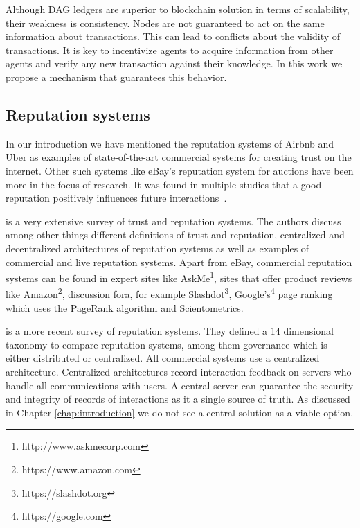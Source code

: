Although DAG ledgers are superior to blockchain solution in terms of scalability, their weakness is
consistency. Nodes are not guaranteed to act on the same information about transactions. This can 
lead to conflicts about the validity of transactions. It is key to incentivize agents to acquire 
information from other agents and verify any new transaction against their knowledge. In this work
we propose a mechanism that guarantees this behavior.

\subsection{Reputation systems}
In our introduction we have mentioned the reputation systems of Airbnb and Uber as examples of 
state-of-the-art commercial systems for creating trust on the internet. Other such systems like 
eBay's reputation system for auctions have been more in the focus of research. It was found in 
multiple studies that a good reputation positively influences future interactions~\cite{resnick2002trust, houser2006reputation, dewan2004adverse}.

\cite{josang2007survey} is a very extensive survey of trust and reputation systems. The authors 
discuss among other things different definitions of trust and reputation, centralized and decentralized architectures 
of reputation systems as well as examples of commercial and live reputation systems. Apart from 
eBay, commercial reputation systems can be found in expert sites like AskMe\footnote{http://www.askmecorp.com},
sites that offer product reviews like Amazon\footnote{https://www.amazon.com}, discussion fora, 
for example Slashdot\footnote{https://slashdot.org}, Google's\footnote{https://google.com} page ranking which uses the PageRank
algorithm\cite{page1999pagerank} and Scientometrics. 

\cite{HENDRIKX2015184} is a more recent survey of reputation systems. They defined a 14 dimensional
taxonomy to compare reputation systems, among them governance which is either distributed or 
centralized. All commercial systems use a centralized
architecture. Centralized architectures record interaction feedback on servers who handle all 
communications with users. A central server can guarantee the security and integrity of records of
interactions as it a single source of truth. As discussed in Chapter \ref{chap:introduction} we do
not see a central solution as a viable option. 

